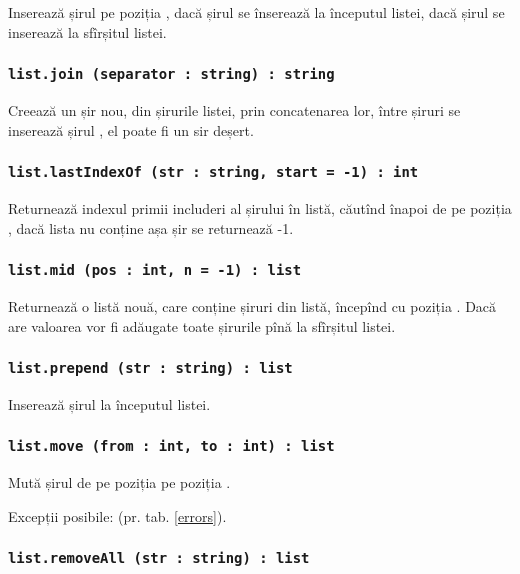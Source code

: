 Inserează șirul  pe poziția , dacă  șirul se înserează la începutul listei, dacă  șirul se inserează la sfîrșitul listei.

\subsubsection{\lstinline|list.join (separator : string) : string|}

Creează un șir nou, din șirurile listei, prin concatenarea lor, între șiruri se inserează șirul , el poate fi un sir deșert.

\subsubsection{\lstinline|list.lastIndexOf (str : string, start = -1) : int|}

Returnează indexul primii includeri al șirului  în listă, căutînd înapoi de pe poziția , dacă lista nu conține așa șir se returnează -1.

\subsubsection{\lstinline|list.mid (pos : int, n = -1) : list|}

Returnează o listă nouă, care conține  șiruri din listă, începînd cu poziția . Dacă  are valoarea  vor fi adăugate toate șirurile pînă la sfîrșitul listei.

\subsubsection{\lstinline|list.prepend (str : string) : list|}

Inserează șirul  la începutul listei.

\subsubsection{\lstinline|list.move (from : int, to : int) : list|}

Mută șirul de pe poziția  pe poziția .

Excepții posibile:  (pr. tab. \ref{errors}).

\subsubsection{\lstinline|list.removeAll (str : string) : list|}


